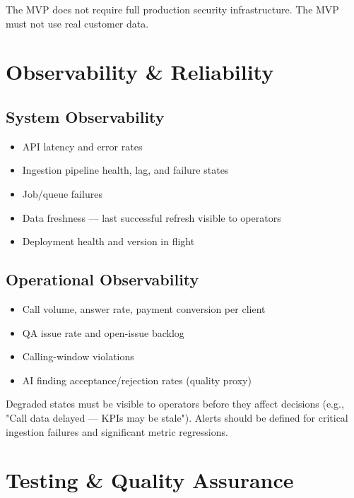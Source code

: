 \documentclass[11pt,a4paper]{article}
\begin{document}
The MVP does not require full production security infrastructure. The MVP must not use real customer data.

\section{Observability \& Reliability}

\subsection{System Observability}

\begin{itemize}
  \item API latency and error rates
  \item Ingestion pipeline health, lag, and failure states
  \item Job/queue failures
  \item Data freshness — last successful refresh visible to operators
  \item Deployment health and version in flight
\end{itemize}

\subsection{Operational Observability}

\begin{itemize}
  \item Call volume, answer rate, payment conversion per client
  \item QA issue rate and open-issue backlog
  \item Calling-window violations
  \item AI finding acceptance/rejection rates (quality proxy)
\end{itemize}

Degraded states must be visible to operators before they affect decisions (e.g., "Call data delayed — KPIs may be stale"). Alerts should be defined for critical ingestion failures and significant metric regressions.

\section{Testing \& Quality Assurance}
\end{document}
